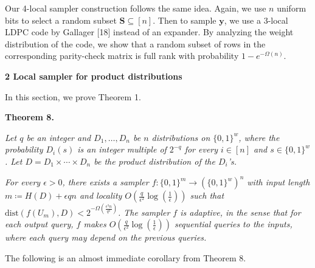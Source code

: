 \documentclass[10pt,a4paper]{article}
\begin{document}
Our 4-local sampler construction follows the same idea.
Again, we use $n$ uniform bits to select a random subset $\boldsymbol{S}\subseteq[n]$.
Then to sample $\boldsymbol{y}$, we use a $3$-local LDPC code by Gallager [18] instead of an expander.
By analyzing the weight distribution of the code, we show that a random subset of rows in the corresponding parity-check matrix is full rank with probability $1-e^{-\Omega(n)}$.\par








\par\medskip\noindent\textbf{
2 Local sampler for product distributions}\par




In this section, we prove Theorem 1.\par





\par\medskip\noindent\textbf{
\textbf{Theorem 8}\textbf{.}
}\par



\emph{Let $q$ be an integer and $D_{1},\ldots,D_{n}$ be $n$ distributions on $\{0,1\}^{w}$, where the probability $D_{i}(s)$ is an integer multiple of $2^{-q}$ for every $i\in[n]$ and $s\in\{0,1\}^{w}$.
Let $D=D_{1}\times\cdots\times D_{n}$ be the product distribution of the $D_{i}$’s.}\par




\emph{For every $\epsilon>0$, there exists a sampler $f\colon\{0,1\}^{m}\to(\{0,1\}^{w})^{n}$ with input length $m\coloneq H(D)+\epsilon qn$ and locality
$O(\frac{q}{\epsilon^{2}}\log(\frac{1}{\epsilon}))$ such that $\mathrm{dist}(f(U_{m}),D)<2^{-\Omega(\frac{\epsilon^{3}n}{q^{2}})}$.
The sampler $f$ is adaptive, in the sense that for each output query, $f$ makes $O(\frac{q}{\epsilon^{2}}\log(\frac{1}{\epsilon}))$ sequential queries to the inputs, where each query may depend on the previous queries.}\par






The following is an almost immediate corollary from Theorem 8.\par
\end{document}
